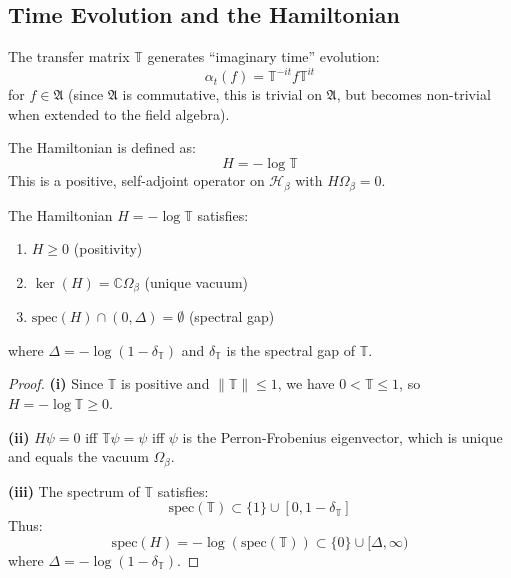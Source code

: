 \subsection{Time Evolution and the Hamiltonian}

\begin{definition}
The transfer matrix $\mathbb{T}$ generates ``imaginary time'' evolution:
\[
\alpha_t(f) = \mathbb{T}^{-it} f \mathbb{T}^{it}
\]
for $f \in \mathfrak{A}$ (since $\mathfrak{A}$ is commutative, this is trivial on $\mathfrak{A}$, 
but becomes non-trivial when extended to the field algebra).
\end{definition}

\begin{definition}[Hamiltonian]
The Hamiltonian is defined as:
\[
H = -\log \mathbb{T}
\]
This is a positive, self-adjoint operator on $\mathcal{H}_\beta$ with $H\Omega_\beta = 0$.
\end{definition}

\begin{theorem}
\label{thm:hamiltonian-spectrum-v2}
The Hamiltonian $H = -\log \mathbb{T}$ satisfies:
\begin{enumerate}[label=(\roman*)]
\item $H \geq 0$ (positivity)
\item $\ker(H) = \mathbb{C} \Omega_\beta$ (unique vacuum)
\item $\text{spec}(H) \cap (0, \Delta) = \emptyset$ (spectral gap)
\end{enumerate}
where $\Delta = -\log(1 - \delta_{\mathbb{T}})$ and $\delta_{\mathbb{T}}$ is the spectral gap 
of $\mathbb{T}$.
\end{theorem}

\begin{proof}
\textbf{(i)} Since $\mathbb{T}$ is positive and $\|\mathbb{T}\| \leq 1$, we have 
$0 < \mathbb{T} \leq 1$, so $H = -\log \mathbb{T} \geq 0$.

\textbf{(ii)} $H \psi = 0$ iff $\mathbb{T} \psi = \psi$ iff $\psi$ is the Perron-Frobenius 
eigenvector, which is unique and equals the vacuum $\Omega_\beta$.

\textbf{(iii)} The spectrum of $\mathbb{T}$ satisfies:
\[
\text{spec}(\mathbb{T}) \subset \{1\} \cup [0, 1 - \delta_{\mathbb{T}}]
\]
Thus:
\[
\text{spec}(H) = -\log(\text{spec}(\mathbb{T})) \subset \{0\} \cup [\Delta, \infty)
\]
where $\Delta = -\log(1 - \delta_{\mathbb{T}})$.
\end{proof}

